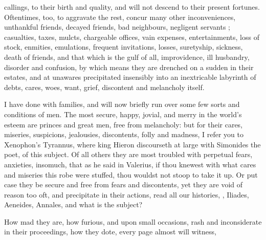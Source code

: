 callings, to their birth and quality, and will not descend
to their present fortunes. Oftentimes, too, to aggravate the rest, concur many
other inconveniences, unthankful friends, decayed friends, bad neighbours,
negligent servants ; casualties, taxes, mulcts, chargeable offices, vain expenses,
entertainments, loss of stock, enmities, emulations, frequent invitations,
losses, suretyship, sickness, death of friends, and that which is the gulf of
all, improvidence, ill husbandry, disorder and confusion, by which means they
are drenched on a sudden in their estates, and at unawares precipitated
insensibly into an inextricable labyrinth of debts, cares, woes, want, grief,
discontent and melancholy itself.

I have done with families, and will now briefly run over some few sorts and
conditions of men. The most secure, happy, jovial, and merry in the world's
esteem are princes and great men, free from melancholy: but for their cares,
miseries, suspicions, jealousies, discontents, folly and madness, I refer you
to Xenophon's Tyrannus, where king Hieron discourseth at large with Simonides
the poet, of this subject. Of all others they are most troubled with perpetual
fears, anxieties, insomuch, that as he said in Valerius, if
thou knewest with what cares and miseries this robe were stuffed, thou wouldst
not stoop to take it up. Or put case they be secure and free from fears and
discontents, yet they are void of reason too oft, and
precipitate in their actions, read all our histories, , Iliades, Aeneides, Annales, and what is the subject?


How mad they are, how furious, and upon small occasions, rash and inconsiderate
in their proceedings, how they dote, every page almost will witness,

